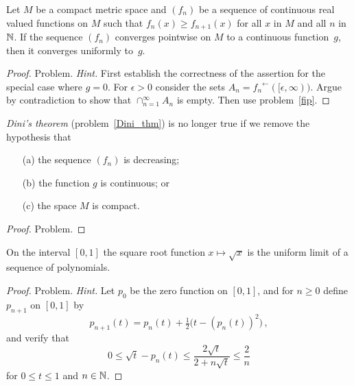 \begin{prop}\label{Dini_thm} Let $M$ be a compact metric space and $(f_n)$ be
a sequence of continuous real valued functions on $M$ such that $f_n(x) \ge f_{n+1}(x)$ for
all $x$ in $M$ and all $n$ in $\mathbb{N}$. If the sequence $(f_n)$ converges pointwise on $M$ to a
continuous function~$g$, then it converges uniformly to~$g$.
\end{prop}

\begin{proof}  Problem.   \emph{Hint.}  First establish the correctness of the assertion for
the special case where $g = 0$. For $\epsilon > 0$ consider the sets $A_n =
{f_n}^{\gets}([\epsilon, \infty))$. Argue by contradiction to show that
$\cap_{n=1}^{\infty}A_n$ is empty. Then use problem~\ref{fip}. \ns
\end{proof}

\begin{exam} \emph{Dini's theorem} (problem~\ref{Dini_thm}) is no longer true if we remove
the hypothesis that
 \begin{enumerate}
  \item[(a)] the sequence $(f_n)$ is decreasing;
  \item[(b)] the function $g$ is continuous; or
  \item[(c)] the space $M$ is compact.
 \end{enumerate}
\end{exam}

\begin{proof} Problem. \ns  \end{proof}

\begin{exam}\label{exam_approx_sqrt} On the interval $[0,1]$ the square root function
$x \mapsto \sqrt x$ is the uniform limit of a sequence of polynomials.
\end{exam}

\begin{proof} Problem. \emph{Hint.}  Let $p_0$ be the zero function on $[0,1]$, and for
$n \ge 0$ define $p_{n+1}$ on $[0,1]$ by
   \[ p_{n+1}(t) = p_n(t) + \tfrac12\bigl(t - (p_n(t))^2\bigr)\,, \]
and verify that
   \[ 0 \le \sqrt t - p_n(t) \le \frac{2\sqrt t}{2 + n\sqrt t} \le \frac2n \]
for $0 \le t \le 1$ and $n \in \mathbb{N}$.  \ns
\end{proof}




\endinput
